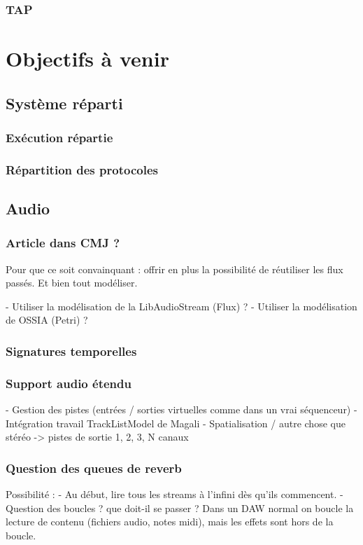 \documentclass[french,a4paper]{book}
\begin{document}
\subsection{TAP}

\chapter{Objectifs à venir}
\section{Système réparti}
\subsection{Exécution répartie}
\subsection{Répartition des protocoles}

\section{Audio}
\subsection{Article dans CMJ ?}
Pour que ce soit convainquant : offrir en plus la possibilité 
de réutiliser les flux passés. Et bien tout modéliser.

- Utiliser la modélisation de la LibAudioStream (Flux) ?
- Utiliser la modélisation de OSSIA (Petri) ?

\subsection{Signatures temporelles}
\subsection{Support audio étendu}
- Gestion des pistes (entrées / sorties virtuelles comme dans un vrai séquenceur)
- Intégration travail TrackListModel de Magali
- Spatialisation / autre chose que stéréo
-> pistes de sortie 1, 2, 3, N canaux 

\subsection{Question des queues de reverb}
Possibilité : 
- Au début, lire tous les streams à l'infini dès qu'ils commencent.
- Question des boucles ? que doit-il se passer ? 
Dans un DAW normal on boucle la lecture de contenu (fichiers audio, notes midi), mais les effets 
sont hors de la boucle.
\end{document}
